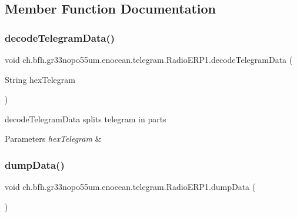 \subsection{Member Function Documentation}
\hypertarget{classch_1_1bfh_1_1gr33nopo55um_1_1enocean_1_1telegram_1_1_radio_e_r_p1_acbd663f1c594bc3f8459d2e2ffb53e52}{}\label{classch_1_1bfh_1_1gr33nopo55um_1_1enocean_1_1telegram_1_1_radio_e_r_p1_acbd663f1c594bc3f8459d2e2ffb53e52} 
\subsubsection{\texorpdfstring{decode\+Telegram\+Data()}{decodeTelegramData()}}
{\footnotesize\ttfamily void ch.\+bfh.\+gr33nopo55um.\+enocean.\+telegram.\+Radio\+E\+R\+P1.\+decode\+Telegram\+Data (\begin{DoxyParamCaption}\item[{String}]{hex\+Telegram }\end{DoxyParamCaption})}

decode\+Telegram\+Data splits telegram in parts


\begin{DoxyParams}{Parameters}
{\em hex\+Telegram} & \\
\hline
\end{DoxyParams}
\hypertarget{classch_1_1bfh_1_1gr33nopo55um_1_1enocean_1_1telegram_1_1_radio_e_r_p1_aa6250ff9185e92c1254fbade5a6f62c6}{}\label{classch_1_1bfh_1_1gr33nopo55um_1_1enocean_1_1telegram_1_1_radio_e_r_p1_aa6250ff9185e92c1254fbade5a6f62c6} 
\subsubsection{\texorpdfstring{dump\+Data()}{dumpData()}}
{\footnotesize\ttfamily void ch.\+bfh.\+gr33nopo55um.\+enocean.\+telegram.\+Radio\+E\+R\+P1.\+dump\+Data (\begin{DoxyParamCaption}{ }\end{DoxyParamCaption})}


